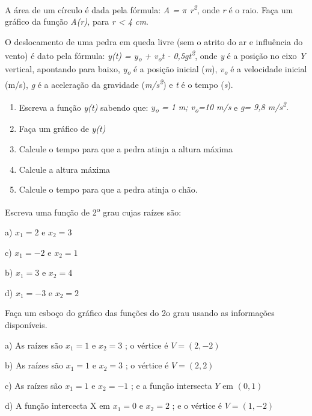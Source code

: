 \begin{enumerate}[label=\thechapter.\arabic*]
\exitem{} A área de um círculo é dada pela fórmula:  \textit{A = $ \pi $  r\textsuperscript{2}}, onde \textit{r} é o raio. Faça um gráfico da função \textit{A(r),} para \textit{r < 4 cm}.

\exitem{} O deslocamento de uma pedra em queda livre (sem o atrito do ar e influência do vento) é dato pela fórmula:  \textit{y(t) = y\textsubscript{o} + v\textsubscript{o}t - 0,5gt\textsuperscript{2}}, onde \textit{y }é a posição no eixo \textit{Y} vertical, apontando para baixo, \textit{y\textsubscript{o}}  é a posição inicial (\textit{m}), \textit{v\textsubscript{o}}  é a velocidade inicial (m/s), \textit{g} é a aceleração da gravidade (\textit{m/s\textsuperscript{2}}) e \textit{t} é o tempo (\textit{s}). 

\begin{enumerate}[label=\thechapter.\alph*)]
	\item Escreva a função \textit{y(t) }sabendo que:   \textit{ y\textsubscript{o} = 1 m; v\textsubscript{o}=10 m/s }e\textit{ g= 9,8 m/s\textsuperscript{2}.}

	\item Faça um gráfico de   \textit{y(t)}

	\item Calcule o tempo para que a pedra atinja a altura máxima

	\item Calcule a altura máxima

	\item Calcule o tempo para que a pedra atinja o chão.
\end{enumerate}

\exitem{} Escreva uma função de 2\textsuperscript{o} grau cujas raízes são: 

a) $x_1 = 2$ e $x_2 = 3$

c) $x_1 = -2$ e $x_2 = 1$

b) $x_1 = 3$ e $x_2 = 4$

d) $x_1 = -3$ e $x_2 = 2$

\exitem{} Faça um esboço do gráfico das funções do 2o grau usando as informações disponíveis.

a) As raízes são $x_1 = 1$ e $x_2 = 3$ ; o vértice é $V=(2,-2)$

b) As raízes são $x_1 = 1$ e $x_2 = 3$ ; o vértice é $V=(2,2)$

c) As raízes são $x_1 = 1$ e $x_2 = -1$ ; e a função intersecta $Y$ em $(0,1)$

d) A função intercecta X em $x_1 = 0$ e $x_2 = 2$ ; e o vértice é $V=(1,-2)$


\end{enumerate}
